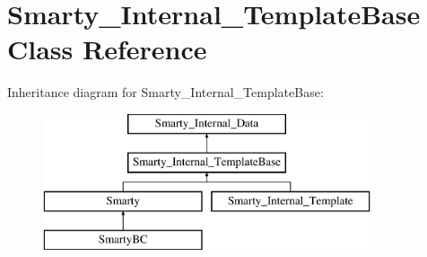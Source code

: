 \hypertarget{class_smarty___internal___template_base}{}\section{Smarty\+\_\+\+Internal\+\_\+\+Template\+Base Class Reference}
\label{class_smarty___internal___template_base}
Inheritance diagram for Smarty\+\_\+\+Internal\+\_\+\+Template\+Base\+:\begin{figure}[H]
\begin{center}
\leavevmode
\includegraphics[height=4.000000cm]{class_smarty___internal___template_base}
\end{center}
\end{figure}

